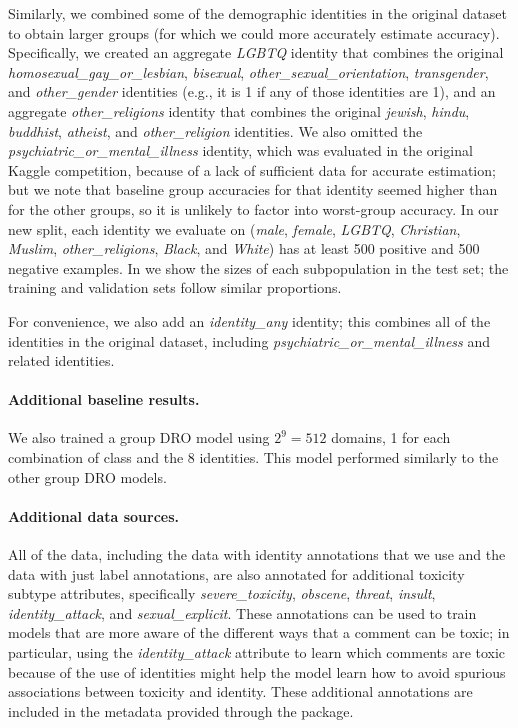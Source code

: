 Similarly, we combined some of the demographic identities in the original dataset to obtain larger groups (for which we could more accurately estimate accuracy). Specifically, we created an aggregate \textit{LGBTQ} identity that combines the original
\textit{homosexual\_gay\_or\_lesbian},
\textit{bisexual},
\textit{other\_sexual\_orientation},
\textit{transgender}, and
\textit{other\_gender} identities (e.g., it is 1 if any of those identities are 1),
and an aggregate \textit{other\_religions} identity that combines the original
\textit{jewish},
\textit{hindu},
\textit{buddhist},
\textit{atheist}, and
\textit{other\_religion} identities.
We also omitted the \textit{psychiatric\_or\_mental\_illness} identity, which was evaluated in the original Kaggle competition, because of a lack of sufficient data for accurate estimation; but we note that baseline group accuracies for that identity seemed higher than for the other groups, so it is unlikely to factor into worst-group accuracy.
In our new split, each identity we evaluate on (\textit{male}, \textit{female}, \textit{LGBTQ}, \textit{Christian}, \textit{Muslim}, \textit{other\_religions}, \textit{Black}, and \textit{White}) has at least 500 positive and 500 negative examples.
In  we show the sizes of each subpopulation in the test set; the training and validation sets follow similar proportions.

For convenience, we also add an \textit{identity\_any} identity; this combines all of the identities in the original dataset, including \textit{psychiatric\_or\_mental\_illness} and related identities.

\paragraph{Additional baseline results.}
We also trained a group DRO model using $2^9 = 512$ domains, 1 for each combination of class and the 8 identities. This model performed similarly to the other group DRO models.

\paragraph{Additional data sources.}
All of the data, including the data with identity annotations that we use and the data with just label annotations, are also annotated for additional toxicity subtype attributes, specifically
\textit{severe\_toxicity},
\textit{obscene},
\textit{threat},
\textit{insult},
\textit{identity\_attack}, and
\textit{sexual\_explicit}.
These annotations can be used to train models that are more aware of the different ways that a comment can be toxic;
in particular, using the \textit{identity\_attack} attribute to learn which comments are toxic because of the use of identities might help the model learn how to avoid spurious associations between toxicity and identity.
These additional annotations are included in the metadata provided through the \Wilds package.

